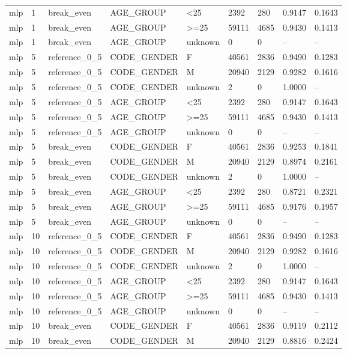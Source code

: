 \begin{longtable}{lllllllll}
mlp & 1 & break\_even & AGE\_GROUP & <25 & 2392 & 280 & 0.9147 & 0.1643 \\
mlp & 1 & break\_even & AGE\_GROUP & >=25 & 59111 & 4685 & 0.9430 & 0.1413 \\
mlp & 1 & break\_even & AGE\_GROUP & unknown & 0 & 0 & -- & -- \\
mlp & 5 & reference\_0\_5 & CODE\_GENDER & F & 40561 & 2836 & 0.9490 & 0.1283 \\
mlp & 5 & reference\_0\_5 & CODE\_GENDER & M & 20940 & 2129 & 0.9282 & 0.1616 \\
mlp & 5 & reference\_0\_5 & CODE\_GENDER & unknown & 2 & 0 & 1.0000 & -- \\
mlp & 5 & reference\_0\_5 & AGE\_GROUP & <25 & 2392 & 280 & 0.9147 & 0.1643 \\
mlp & 5 & reference\_0\_5 & AGE\_GROUP & >=25 & 59111 & 4685 & 0.9430 & 0.1413 \\
mlp & 5 & reference\_0\_5 & AGE\_GROUP & unknown & 0 & 0 & -- & -- \\
mlp & 5 & break\_even & CODE\_GENDER & F & 40561 & 2836 & 0.9253 & 0.1841 \\
mlp & 5 & break\_even & CODE\_GENDER & M & 20940 & 2129 & 0.8974 & 0.2161 \\
mlp & 5 & break\_even & CODE\_GENDER & unknown & 2 & 0 & 1.0000 & -- \\
mlp & 5 & break\_even & AGE\_GROUP & <25 & 2392 & 280 & 0.8721 & 0.2321 \\
mlp & 5 & break\_even & AGE\_GROUP & >=25 & 59111 & 4685 & 0.9176 & 0.1957 \\
mlp & 5 & break\_even & AGE\_GROUP & unknown & 0 & 0 & -- & -- \\
mlp & 10 & reference\_0\_5 & CODE\_GENDER & F & 40561 & 2836 & 0.9490 & 0.1283 \\
mlp & 10 & reference\_0\_5 & CODE\_GENDER & M & 20940 & 2129 & 0.9282 & 0.1616 \\
mlp & 10 & reference\_0\_5 & CODE\_GENDER & unknown & 2 & 0 & 1.0000 & -- \\
mlp & 10 & reference\_0\_5 & AGE\_GROUP & <25 & 2392 & 280 & 0.9147 & 0.1643 \\
mlp & 10 & reference\_0\_5 & AGE\_GROUP & >=25 & 59111 & 4685 & 0.9430 & 0.1413 \\
mlp & 10 & reference\_0\_5 & AGE\_GROUP & unknown & 0 & 0 & -- & -- \\
mlp & 10 & break\_even & CODE\_GENDER & F & 40561 & 2836 & 0.9119 & 0.2112 \\
mlp & 10 & break\_even & CODE\_GENDER & M & 20940 & 2129 & 0.8816 & 0.2424 \\

\end{longtable}

